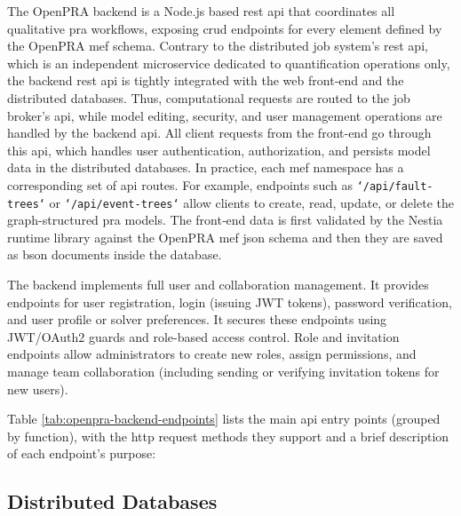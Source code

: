 The OpenPRA backend is a Node.js based \acrshort{rest} \acrshort{api} that coordinates all qualitative \acrshort{pra} workflows, exposing \acrfull{crud} endpoints for every element defined by the OpenPRA \acrfull{mef} schema. Contrary to the distributed job system's \acrshort{rest} \acrshort{api}, which is an independent microservice dedicated to quantification operations only, the backend \acrshort{rest} \acrshort{api} is tightly integrated with the web front‑end and the distributed databases. Thus, computational requests are routed to the job broker’s \acrshort{api}, while model editing, security, and user management operations are handled by the backend \acrshort{api}. All client requests from the front-end go through this \acrshort{api}, which handles user authentication, authorization, and persists model data in the distributed databases. In practice, each \acrshort{mef} namespace has a corresponding set of \acrshort{api} routes. For example, endpoints such as \texttt{`/api/fault-trees`} or \texttt{`/api/event-trees`} allow clients to create, read, update, or delete the graph-structured \acrshort{pra} models.  The front‑end data is first validated by the Nestia runtime library against the OpenPRA \acrshort{mef} \acrshort{json} schema and then they are saved as \acrfull{bson} documents inside the database.

The backend implements full user and collaboration management.  It provides endpoints for user registration, login (issuing JWT tokens), password verification, and user profile or solver preferences.  It secures these endpoints using JWT/OAuth2 guards and role-based access control. Role and invitation endpoints allow administrators to create new roles, assign permissions, and manage team collaboration (including sending or verifying invitation tokens for new users).  

Table \ref{tab:openpra-backend-endpoints} lists the main \acrshort{api} entry points (grouped by function), with the \acrshort{http} request methods they support and a brief description of each endpoint’s purpose:



\subsection{Distributed Databases}

